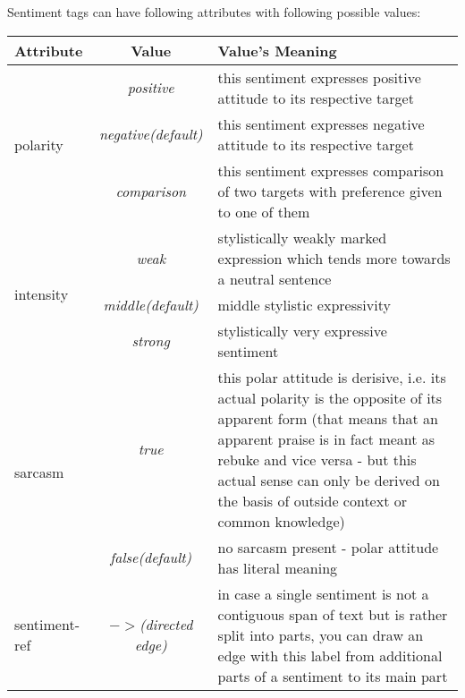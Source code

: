 \documentclass[11pt,a4paper]{article}
\begin{document}
Sentiment tags can have following attributes with following possible
values:\\
\begin{tabular}[t]{|l|c|p{}|}\hline
  Attribute & Value & Value's Meaning\\\hline

  \multirow{3}{*}{polarity} & \textit{positive} & this sentiment
  expresses positive attitude to its respective target\\\cline{2-3}

  & \textit{negative\newline(default)} & this sentiment
  expresses negative attitude to its respective target\\\cline{2-3}

  & \textit{comparison} & this sentiment expresses comparison of two
  targets with preference given to one of them\\\hline

  \multirow{3}{*}{intensity} & \textit{weak} & stylistically weakly
  marked expression which tends more towards a neutral
  sentence\\\cline{2-3}

  & \textit{middle\newline(default)} & middle stylistic
  expressivity\\\cline{2-3}

  & \textit{strong} & stylistically very expressive sentiment\\\hline

  \multirow{2}{*}{sarcasm} & \textit{true} & this polar attitude is
  derisive, i.e. its actual polarity is the opposite of its apparent
  form (that means that an apparent praise is in fact meant as rebuke
  and vice versa - but this actual sense can only be derived on the
  basis of outside context or common knowledge)\\\cline{2-3}

  & \textit{false\newline(default)} & no sarcasm present - polar
  attitude has literal meaning\\\hline

  sentiment-ref & \textit{$->$\newline(directed edge)} & in case a
  single sentiment is not a contiguous span of text but is rather split into
  parts, you can draw an edge with this label from additional parts of
  a sentiment to its main part\\\hline
\end{tabular}
\end{document}
